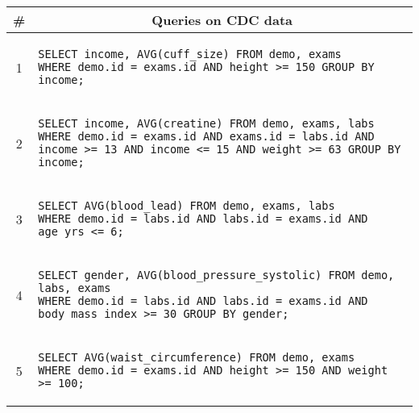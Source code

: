 {
  \lstset{breaklines=true, basicstyle=\scriptsize\ttfamily}
\begin{tabular}{cl}
  \toprule
  \# & \multicolumn{1}{c}{Queries on CDC data} \\
  \midrule
  1 & 
      \begin{minipage}{6in}
\begin{lstlisting}[breaklines, basicstyle=\scriptsize\ttfamily]
SELECT income, AVG(cuff_size) FROM demo, exams 
WHERE demo.id = exams.id AND height >= 150 GROUP BY income;
\end{lstlisting}
      \end{minipage}{queryno}\label[query]{q1} \\[-1.5ex]
  2 & 
      \begin{minipage}{6in}
\begin{lstlisting}[breaklines, basicstyle=\scriptsize\ttfamily]
SELECT income, AVG(creatine) FROM demo, exams, labs WHERE demo.id = exams.id AND exams.id = labs.id AND income >= 13 AND income <= 15 AND weight >= 63 GROUP BY income;
\end{lstlisting}
      \end{minipage}
      {queryno}\label[query]{q2} \\[-1.5ex]
  3 & 
      \begin{minipage}{6in}
\begin{lstlisting}[breaklines]
SELECT AVG(blood_lead) FROM demo, exams, labs 
WHERE demo.id = labs.id AND labs.id = exams.id AND age_yrs <= 6;
\end{lstlisting}
      \end{minipage}{queryno}\label[query]{q3}\\[-1.5ex]
  4 & 
      \begin{minipage}{6in}
\begin{lstlisting}[breaklines]
SELECT gender, AVG(blood_pressure_systolic) FROM demo, labs, exams 
WHERE demo.id = labs.id AND labs.id = exams.id AND body_mass_index >= 30 GROUP BY gender;
\end{lstlisting}
      \end{minipage}{queryno}\label[query]{q4}\\[-1.5ex]
  5 & 
      \begin{minipage}{6in}
\begin{lstlisting}[breaklines]
SELECT AVG(waist_circumference) FROM demo, exams 
WHERE demo.id = exams.id AND height >= 150 AND weight >= 100;
\end{lstlisting}

\end{minipage}
\end{tabular}}
